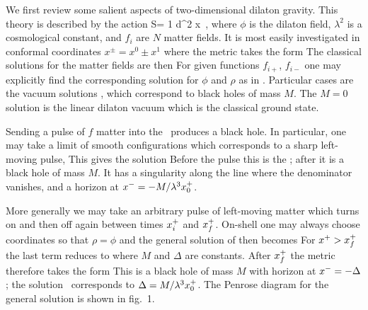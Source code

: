 
We first review some salient aspects of two-dimensional dilaton gravity.
This theory is described by the action
%
\eqn\one
{S= { 1 \pi}\int d^2 x\Bigl[e^{-2\phi}(R+4(\nabla\phi)^2
+4\lambda^2)
-\half\sum\limits^N_{i=1}(\nabla f_i)^2\Bigr]\ ,}
%
where $\phi$ is the dilaton field, $\lambda^2$ is a cosmological constant,
and $f_i$ are $N$ matter fields.  It is most easily investigated in
conformal coordinates $x^\pm=x^0\pm x^1$
where the metric takes the form
%
\eqn{}
%
The classical solutions for the matter fields are then
%
\eqn{}
%
For given functions $f_{i+}$, $f_{i-}$ one may
explicitly find the corresponding solution for $\phi$ and $\rho$ as in
.  Particular cases are the vacuum
solutions ,
%
\eqn{}
%
which correspond to black holes of mass $M$.  The $M=0$ solution is the
linear dilaton vacuum which is the classical ground state.

Sending a pulse of $f$ matter into the \LDV\ produces a black hole.  In
particular, one may take a limit of smooth configurations which corresponds
to a sharp left-moving pulse,
%
\eqn{}
%
This gives the solution
%
\eqn{}
%
Before the pulse this is the \LDV; after it is a black hole of mass $M$.
It has a singularity along the line where the denominator vanishes, and a
horizon at $x^-=-M/\lambda^3 x^+_0$.

More generally we may take an arbitrary pulse of left-moving matter which
turns on and then off again between times $x^+_i$ and $x^+_f$.  On-shell
one may always choose coordinates so that $\rho=\phi$ and the general
solution of \refs{\CGHS} then becomes
%
\eqn\gensol{e^{-2\rho} = e^{-2\phi} =-\lambda^2 \xp\xm -\int d\xp
\int d\xp T^f_{++}\ . }
%
For $x^+>x^+_f$ the last term reduces to
%
\eqn{}
%
where $M$ and $\Delta$ are constants.  After $x^+_f$ the metric therefore
takes the form
%
\eqn\fmet{ds^2 = -{d\xp d\xm \over {M\over\lambda} - \lambda^2\xp(\xm
+\Delta)}\ .}
%
This is a black hole of mass $M$ with horizon at $x^-=-\Delta$;
the solution \collsoln\ corresponds to $\Delta=M/\lambda^3x^+_0$.
The Penrose diagram for the general solution is shown in fig.~1.

